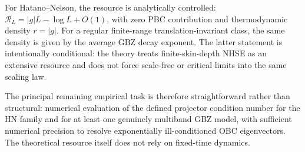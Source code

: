 \documentclass[reprint,amsmath,amssymb,aps,nofootinbib]{revtex4-2}
\begin{document}
For Hatano--Nelson, the resource is analytically controlled:
\(\mathcal R_L=|g|L-\log L+O(1)\), with zero PBC contribution and thermodynamic
density \(r=|g|\). For a regular finite-range translation-invariant class, the
same density is given by the average GBZ decay exponent. The latter statement
is intentionally conditional: the theory treats finite-skin-depth NHSE as an
extensive resource and does not force scale-free or critical limits into the
same scaling law.

The principal remaining empirical task is therefore straightforward rather
than structural: numerical evaluation of the defined projector condition
number for the HN family and for at least one genuinely multiband GBZ model,
with sufficient numerical precision to resolve exponentially ill-conditioned
OBC eigenvectors. The theoretical resource itself does not rely on fixed-time
dynamics.

\begin{acknowledgments}
\end{acknowledgments}
\end{document}
